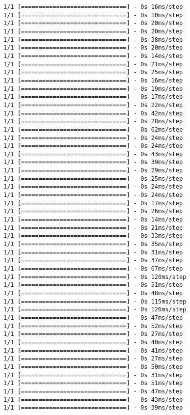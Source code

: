 \documentclass[11pt]{article}
\begin{document}
\begin{Verbatim}[commandchars=\\\{\}]
1/1 [==============================] - 0s 16ms/step
1/1 [==============================] - 0s 10ms/step
1/1 [==============================] - 0s 20ms/step
1/1 [==============================] - 0s 20ms/step
1/1 [==============================] - 0s 38ms/step
1/1 [==============================] - 0s 20ms/step
1/1 [==============================] - 0s 14ms/step
1/1 [==============================] - 0s 21ms/step
1/1 [==============================] - 0s 25ms/step
1/1 [==============================] - 0s 16ms/step
1/1 [==============================] - 0s 19ms/step
1/1 [==============================] - 0s 17ms/step
1/1 [==============================] - 0s 22ms/step
1/1 [==============================] - 0s 42ms/step
1/1 [==============================] - 0s 28ms/step
1/1 [==============================] - 0s 62ms/step
1/1 [==============================] - 0s 24ms/step
1/1 [==============================] - 0s 24ms/step
1/1 [==============================] - 0s 43ms/step
1/1 [==============================] - 0s 39ms/step
1/1 [==============================] - 0s 29ms/step
1/1 [==============================] - 0s 25ms/step
1/1 [==============================] - 0s 24ms/step
1/1 [==============================] - 0s 24ms/step
1/1 [==============================] - 0s 17ms/step
1/1 [==============================] - 0s 26ms/step
1/1 [==============================] - 0s 14ms/step
1/1 [==============================] - 0s 21ms/step
1/1 [==============================] - 0s 33ms/step
1/1 [==============================] - 0s 35ms/step
1/1 [==============================] - 0s 31ms/step
1/1 [==============================] - 0s 37ms/step
1/1 [==============================] - 0s 67ms/step
1/1 [==============================] - 0s 120ms/step
1/1 [==============================] - 0s 51ms/step
1/1 [==============================] - 0s 48ms/step
1/1 [==============================] - 0s 115ms/step
1/1 [==============================] - 0s 126ms/step
1/1 [==============================] - 0s 47ms/step
1/1 [==============================] - 0s 52ms/step
1/1 [==============================] - 0s 27ms/step
1/1 [==============================] - 0s 40ms/step
1/1 [==============================] - 0s 41ms/step
1/1 [==============================] - 0s 27ms/step
1/1 [==============================] - 0s 50ms/step
1/1 [==============================] - 0s 31ms/step
1/1 [==============================] - 0s 51ms/step
1/1 [==============================] - 0s 47ms/step
1/1 [==============================] - 0s 43ms/step
1/1 [==============================] - 0s 39ms/step

\end{Verbatim}
\end{document}
